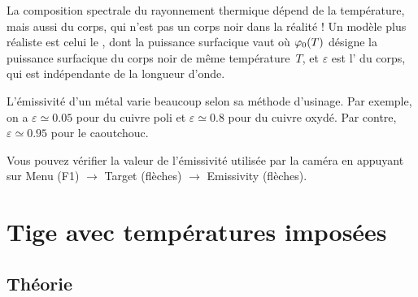 La composition spectrale du rayonnement thermique dépend de la température, mais aussi du corps, qui n’est pas un corps noir dans la réalité ! Un modèle plus réaliste est celui le , dont la puissance surfacique vaut 
où $\varphi_0(T)$ désigne la puissance surfacique du corps noir de même température~$T$, et $\varepsilon$  est l’ du corps, qui est indépendante de la longueur d'onde. 


L'émissivité d'un métal varie beaucoup selon sa méthode d'usinage. Par exemple, on a $\varepsilon \simeq \num{0.05}$ pour du cuivre poli et $\varepsilon \simeq \num{0.8}$ pour du cuivre oxydé. Par contre, $\varepsilon \simeq \num{0.95}$ pour le caoutchouc.

\begin{quest}
\end{quest}


\begin{remarque}
Vous pouvez vérifier la valeur de l'émissivité utilisée par la caméra en appuyant sur Menu (F1) $\rightarrow$ Target (flèches) $\rightarrow$ Emissivity (flèches).
\end{remarque}

\section{Tige avec températures imposées}
\label{sec:tige}

\subsection{Théorie}


